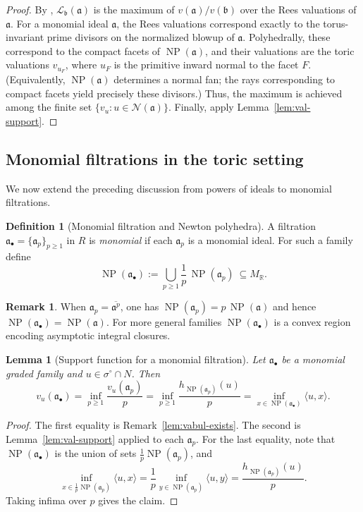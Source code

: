 \documentclass[12pt]{amsart}
\newcommand{\RR}{\mathbb{R}}
\renewcommand{\a}{\mathfrak{a}}
\renewcommand{\b}{\mathfrak{b}}
\newcommand{\Loj}{\mathcal{L}} %
\newcommand{\ip}[2]{{\langle #1,#2\rangle}}
\DeclareMathOperator{\NP}{NP}
\newcommand{\abul}{{\a_\bullet}}
\theoremstyle{plain}
\newtheorem{lemma}[theorem]{Lemma}
\theoremstyle{definition}
\newtheorem{definition}[theorem]{Definition}
\newtheorem{remark}[theorem]{Remark}
\numberwithin{equation}{section}
\begin{document}
\begin{proof}
	By , $\Loj_{\b}(\a)$ is the maximum of
	$v(\a)/v(\b)$ over the Rees valuations of $\a$.
	For a monomial ideal $\a$, the Rees valuations correspond exactly to the torus-invariant
	prime divisors on the normalized blowup of $\a$. Polyhedrally, these correspond to the
	compact facets of $\NP(\a)$, and their valuations are the toric valuations $v_{u_F}$,
	where $u_F$ is the primitive inward normal to the facet $F$.
	(Equivalently, $\NP(\a)$ determines a normal fan; the rays corresponding to compact facets
	yield precisely these divisors.)
	Thus, the maximum is achieved among the finite set $\{v_u: u\in\mathcal N(\a)\}$.
	Finally, apply Lemma~\ref{lem:val-support}.
\end{proof}

\subsection{Monomial filtrations in the toric setting}

We now extend the preceding discussion from powers of ideals to monomial filtrations.

\begin{definition}[Monomial filtration and Newton polyhedra]\label{def:monomial-filtration}
	A filtration $\abul=\{\a_p\}_{p \ge 1}$ in $R$ is \emph{monomial} if each $\a_p$ is a monomial ideal.
	For such a family define
	\[
	\NP(\abul):=\bigcup_{p\ge1}\frac{1}{p}\,\NP(\a_p)\ \subseteq  M_\RR.
	\]
\end{definition}

\begin{remark}
	When $\a_p=\overline{\a^p}$, one has $\NP(\a_p)=p\,\NP(\a)$ and hence
	$\NP(\abul)=\NP(\a)$. For more general families $\NP(\abul)$ is a convex region
	encoding asymptotic integral closures.
\end{remark}

\begin{lemma}[Support function for a monomial filtration]\label{lem:support-filtration}
	Let $\abul$ be a monomial graded family and $u\in\sigma^\circ\cap N$.
	Then
	\[
	v_u(\abul)=\inf_{p\ge1}\frac{v_u(\a_p)}{p}
	=\inf_{p\ge1}\frac{h_{\NP(\a_p)}(u)}{p}
	=\inf_{x\in \NP(\abul)}\ip{u}{x}.
	\]
\end{lemma}

\begin{proof}
	The first equality is Remark~\ref{lem:vabul-exists}.
	The second is Lemma~\ref{lem:val-support} applied to each $\a_p$.
	For the last equality, note that $\NP(\abul)$ is the union of sets $\frac1p\NP(\a_p)$, and
	\[
	\inf_{x\in \frac1p\NP(\a_p)}\ip{u}{x}=\frac{1}{p}\inf_{y\in\NP(\a_p)}\ip{u}{y}
	=\frac{h_{\NP(\a_p)}(u)}{p}.
	\]
	Taking infima over $p$ gives the claim.
\end{proof} 
\end{document}

